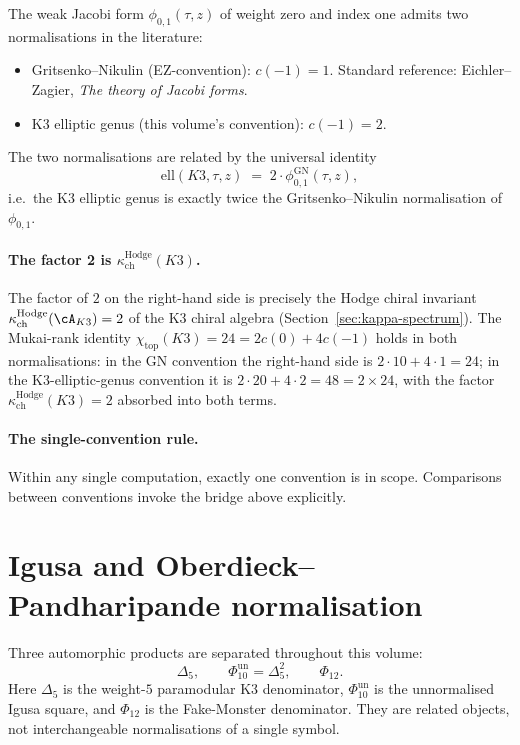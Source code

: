 The weak Jacobi form $\phi_{0,1}(\tau, z)$ of weight zero and index one
admits two normalisations in the literature:
\begin{itemize}
 \item Gritsenko--Nikulin (EZ-convention): $c(-1) = 1$. Standard reference:
 Eichler--Zagier, \emph{The theory of Jacobi forms}.
 \item K3 elliptic genus (this volume's convention): $c(-1) = 2$.
\end{itemize}

The two normalisations are related by the universal identity
\[
 \boxed{\;\mathrm{ell}(K3, \tau, z) \;=\; 2 \cdot \phi_{0,1}^{\mathrm{GN}}(\tau, z),\;}
\]
i.e.\ the K3 elliptic genus is exactly twice the Gritsenko--Nikulin
normalisation of $\phi_{0,1}$.

\paragraph{The factor 2 is \texorpdfstring{$\kappa_{\mathrm{ch}}^{\mathrm{Hodge}}(K3)$}{kappa-ch-Hodge(K3)}.}
The factor of $2$ on the right-hand side is precisely the
Hodge chiral invariant $\kappa_{\mathrm{ch}}^{\mathrm{Hodge}}(\cA_{K3}) = 2$
of the K3 chiral algebra (Section~\ref{sec:kappa-spectrum}). The Mukai-rank identity
$\chi_{\mathrm{top}}(K3) = 24 = 2 c(0) + 4 c(-1)$ holds in both
normalisations: in the GN convention the right-hand side is
$2 \cdot 10 + 4 \cdot 1 = 24$; in the K3-elliptic-genus convention it is
$2 \cdot 20 + 4 \cdot 2 = 48 = 2 \times 24$, with the
factor \(\kappa_{\mathrm{ch}}^{\mathrm{Hodge}}(K3)=2\) absorbed into both terms.

\paragraph{The single-convention rule.}
Within any single computation, exactly one convention is in scope.
Comparisons between conventions invoke the bridge above explicitly.


\section{Igusa and Oberdieck--Pandharipande normalisation}
\label{sec:igusa-op-normalisation}

Three automorphic products are separated throughout this volume:
\[
 \Delta_5,\qquad \Phi_{10}^{\mathrm{un}} = \Delta_5^2,\qquad
 \Phi_{12}.
\]
Here $\Delta_5$ is the weight-$5$ paramodular K3 denominator,
$\Phi_{10}^{\mathrm{un}}$ is the unnormalised Igusa square, and
$\Phi_{12}$ is the Fake-Monster denominator.  They are related objects,
not interchangeable normalisations of a single symbol.

